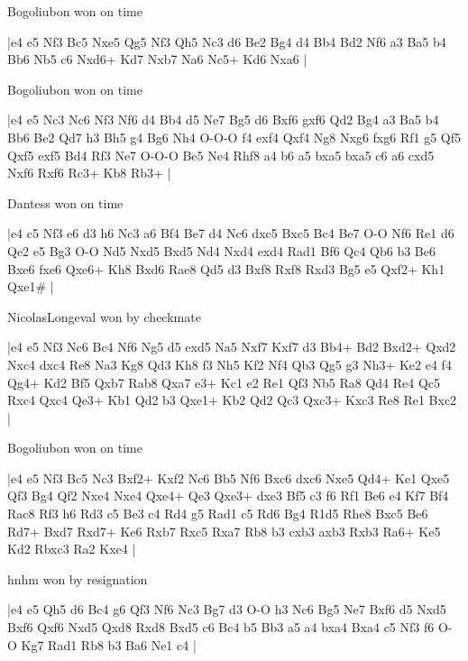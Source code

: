 Bogoliubon won on time

\makegametitle
|e4 e5 Nf3 Bc5 Nxe5 Qg5 Nf3 Qh5 Nc3 d6 Be2 Bg4 d4 Bb4 Bd2 Nf6 a3 Ba5 b4 Bb6 Nb5 c6 Nxd6+ Kd7 Nxb7 Na6 Nc5+ Kd6 Nxa6  |

\showboard

Bogoliubon won on time

\makegametitle
|e4 e5 Nc3 Nc6 Nf3 Nf6 d4 Bb4 d5 Ne7 Bg5 d6 Bxf6 gxf6 Qd2 Bg4 a3 Ba5 b4 Bb6 Be2 Qd7 h3 Bh5 g4 Bg6 Nh4 O-O-O f4 exf4 Qxf4 Ng8 Nxg6 fxg6 Rf1 g5 Qf5 Qxf5 exf5 Bd4 Rf3 Ne7 O-O-O Be5 Ne4 Rhf8 a4 b6 a5 bxa5 bxa5 c6 a6 cxd5 Nxf6 Rxf6 Rc3+ Kb8 Rb3+  |

\showboard

Dantess won on time

\makegametitle
|e4 c5 Nf3 e6 d3 h6 Nc3 a6 Bf4 Be7 d4 Nc6 dxc5 Bxc5 Bc4 Be7 O-O Nf6 Re1 d6 Qe2 e5 Bg3 O-O Nd5 Nxd5 Bxd5 Nd4 Nxd4 exd4 Rad1 Bf6 Qc4 Qb6 b3 Be6 Bxe6 fxe6 Qxe6+ Kh8 Bxd6 Rae8 Qd5 d3 Bxf8 Rxf8 Rxd3 Bg5 e5 Qxf2+ Kh1 Qxe1\#  |

\showboard

NicolasLongeval won by checkmate

\makegametitle
|e4 e5 Nf3 Nc6 Bc4 Nf6 Ng5 d5 exd5 Na5 Nxf7 Kxf7 d3 Bb4+ Bd2 Bxd2+ Qxd2 Nxc4 dxc4 Re8 Na3 Kg8 Qd3 Kh8 f3 Nh5 Kf2 Nf4 Qb3 Qg5 g3 Nh3+ Ke2 e4 f4 Qg4+ Kd2 Bf5 Qxb7 Rab8 Qxa7 e3+ Kc1 e2 Re1 Qf3 Nb5 Ra8 Qd4 Re4 Qc5 Rxc4 Qxc4 Qe3+ Kb1 Qd2 b3 Qxe1+ Kb2 Qd2 Qc3 Qxc3+ Kxc3 Re8 Re1 Bxc2  |

\showboard

Bogoliubon won on time

\makegametitle
|e4 e5 Nf3 Bc5 Nc3 Bxf2+ Kxf2 Nc6 Bb5 Nf6 Bxc6 dxc6 Nxe5 Qd4+ Ke1 Qxe5 Qf3 Bg4 Qf2 Nxe4 Nxe4 Qxe4+ Qe3 Qxe3+ dxe3 Bf5 c3 f6 Rf1 Be6 e4 Kf7 Bf4 Rac8 Rf3 h6 Rd3 c5 Be3 c4 Rd4 g5 Rad1 c5 Rd6 Bg4 R1d5 Rhe8 Bxc5 Be6 Rd7+ Bxd7 Rxd7+ Ke6 Rxb7 Rxc5 Rxa7 Rb8 b3 cxb3 axb3 Rxb3 Ra6+ Ke5 Kd2 Rbxc3 Ra2 Kxe4  |

\showboard

hnhm won by resignation

\makegametitle
|e4 e5 Qh5 d6 Bc4 g6 Qf3 Nf6 Nc3 Bg7 d3 O-O h3 Nc6 Bg5 Ne7 Bxf6 d5 Nxd5 Bxf6 Qxf6 Nxd5 Qxd8 Rxd8 Bxd5 c6 Bc4 b5 Bb3 a5 a4 bxa4 Bxa4 c5 Nf3 f6 O-O Kg7 Rad1 Rb8 b3 Ba6 Ne1 c4  |

